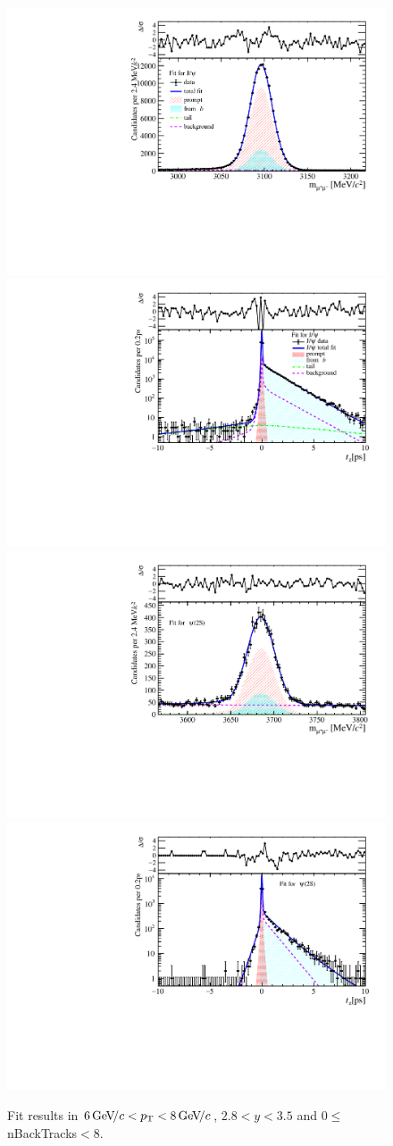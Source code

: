 \begin{figure}[H]
\begin{center}
\includegraphics[width=0.47\linewidth]{pdf/Jpsi/drawmassB/n1y2pt4.pdf}
\includegraphics[width=0.47\linewidth]{pdf/Jpsi/2DFitB/n1y2pt4.pdf}
\vspace*{-0.5cm}
\includegraphics[width=0.47\linewidth]{pdf/Psi2S/drawmassB/n1y2pt4.pdf}
\includegraphics[width=0.47\linewidth]{pdf/Psi2S/2DFitB/n1y2pt4.pdf}
\vspace*{-0.5cm}
\end{center}
\caption{Fit results in $6\text{\,Ge\kern -0.1em V\!/}c<p_{\mathrm{T}}<8\text{\,Ge\kern -0.1em V\!/}c$, $2.8<y<3.5$ and 0$\leq$nBackTracks$<$8.}
\label{Fitn1y2pt4}
\end{figure}
